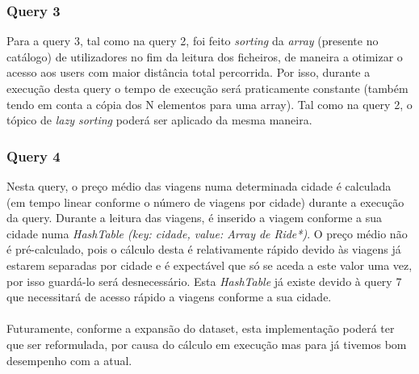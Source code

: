 \documentclass{article}
\begin{document}
        \subsubsection{Query 3}
            Para a query 3, tal como na query 2, foi feito \emph{sorting} da
            \emph{array} (presente no catálogo) de utilizadores no fim da leitura
            dos ficheiros, de maneira a otimizar o acesso aos users com maior 
            distância total percorrida.
            Por isso, durante a execução desta query o tempo de execução será praticamente
            constante (também tendo em conta a cópia dos N elementos para uma array).
            Tal como na query 2, o tópico de \emph{lazy sorting} poderá ser aplicado
            da mesma maneira.
        \subsubsection{Query 4}
            Nesta query, o preço médio das viagens numa determinada cidade é 
            calculada (em tempo linear conforme o número de viagens por cidade)
            durante a execução da query. Durante a leitura das viagens,
            é inserido a viagem conforme a sua cidade numa 
            \emph{HashTable (key: cidade, value: Array de Ride*)}. 
            O preço médio não é pré-calculado, pois o cálculo desta é 
            relativamente rápido devido às viagens já estarem separadas por cidade
            e é expectável que só se aceda a este valor uma vez, por isso
            guardá-lo será desnecessário.
            Esta \emph{HashTable} já existe devido à query 7 que necessitará de
            acesso rápido a viagens conforme a sua cidade. 
            \\
            \\Futuramente, conforme a expansão do dataset, esta implementação 
            poderá ter que ser reformulada, por causa do cálculo em execução mas
            para já tivemos bom desempenho com a atual.
        
\end{document}
